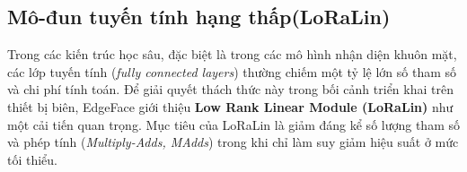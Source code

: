 





\subsection{Mô-đun tuyến tính hạng thấp(LoRaLin)}

 
Trong các kiến trúc học sâu, đặc biệt là trong các mô hình nhận diện khuôn mặt, các lớp tuyến tính (\textit{fully connected layers}) thường chiếm một tỷ lệ lớn số tham số và chi phí tính toán. Để giải quyết thách thức này trong bối cảnh triển khai trên thiết bị biên, EdgeFace giới thiệu \textbf{Low Rank Linear Module (LoRaLin)} như một cải tiến quan trọng. Mục tiêu của LoRaLin là giảm đáng kể số lượng tham số và phép tính (\textit{Multiply-Adds, MAdds}) trong khi chỉ làm suy giảm hiệu suất ở mức tối thiểu.


